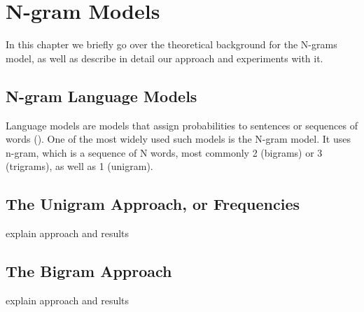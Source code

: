 \chapter{N-gram Models}
\label{chap:N-gram Models}

In this chapter we briefly go over the theoretical background for the N-grams
model, as well as describe in detail our approach and experiments with it.
\section{N-gram Language Models}
Language models are models that assign probabilities to sentences or
sequences of words (\cite{Jura09a}). One of the most widely used such models
is the N-gram model. It uses n-gram, which is a sequence of N words, most
commonly 2 (bigrams) or 3 (trigrams), as well as 1 (unigram).


\section{The Unigram Approach, or Frequencies}
explain approach and results

\section{The Bigram Approach}
explain approach and results